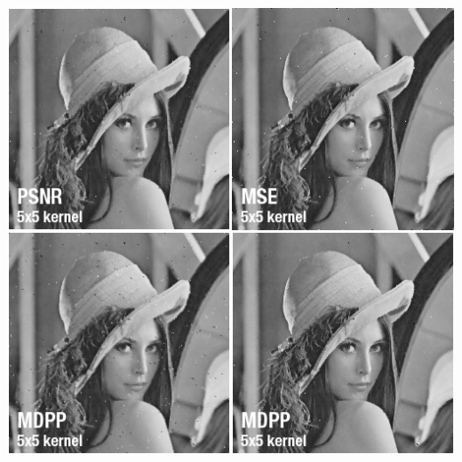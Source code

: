 \documentclass{beamer}
\begin{document}
\begin{frame}[t,fragile]
\begin{columns}[onlytextwidth]
			\begin{column}{0.6\textwidth}
				\includegraphics[width=\textwidth]{img/best5.jpg}
			\end{column}
		\end{columns}
			
	\end{frame}	
	
	
\end{document}
